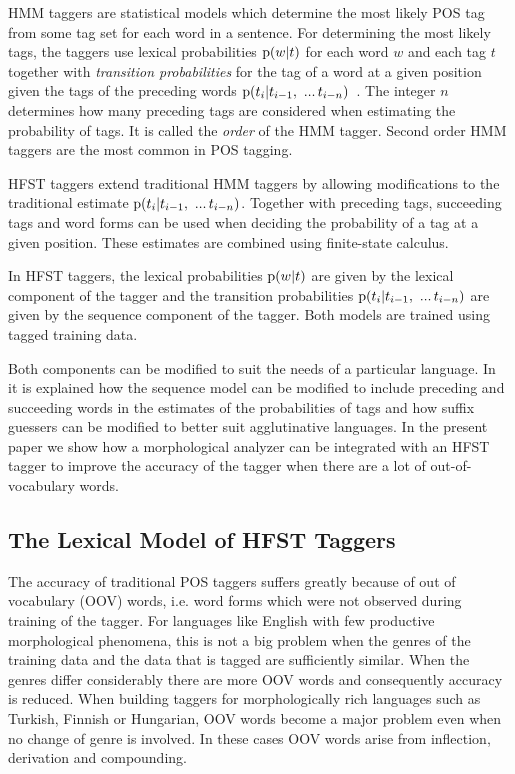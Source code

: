 \documentclass{llncs}
\begin{document}
HMM taggers are statistical models which determine the most likely
POS tag from some tag set for each word in a sentence. For
determining the most likely tags, the taggers use
lexical probabilities ${\rm p}(w|t)$ for each word $w$ and each tag
$t$ together with \emph{transition probabilities} for the tag of a
word at a given position given the tags of the preceding words ${\rm
  p}(t_i | t_{i - 1},\ ...\, t_{i-n})$~\cite{silfverberg/2011/nodalida}. The integer $n$ determines how
many preceding tags are considered when estimating the probability of
tags. It is called the \emph{order} of the HMM tagger. Second order HMM
taggers are the most common in POS tagging.

HFST taggers extend traditional HMM taggers by allowing modifications
to the traditional estimate ${\rm p}(t_i | t_{i - 1},\ ...\,
t_{i-n})$. Together with preceding tags, succeeding tags and word
forms can be used when deciding the probability of a tag at a given
position. These estimates are combined using finite-state calculus.

In HFST taggers, the lexical probabilities ${\rm p}(w|t)$ are given by
the lexical component of the tagger and the transition probabilities
${\rm p}(t_i | t_{i - 1},\ ...\, t_{i-n})$ are given by the sequence
component of the tagger. Both models are trained using tagged
training data.

Both components can be modified to suit the needs of a particular
language. In~\cite{silfverberg/2011/nodalida} it is explained how the sequence
model can be modified to include preceding and succeeding words in
the estimates of the probabilities of tags and how suffix guessers
can be modified to better suit agglutinative languages. In the present paper
we show how a morphological analyzer can be integrated with an HFST
tagger to improve the accuracy of the tagger when there are a lot of
out-of-vocabulary words.


\subsection{The Lexical Model of HFST Taggers}

The accuracy of traditional POS taggers suffers greatly because of
out of vocabulary (OOV) words, i.e. word forms which were not
observed during training of the tagger. For languages like English
with few productive morphological phenomena, this is not a big problem
when the genres of the training data and the data that is tagged are
sufficiently similar. When the genres differ considerably there are
more OOV words and consequently accuracy is reduced. When building
taggers for morphologically rich languages such as Turkish, Finnish or
Hungarian, OOV words become a major problem even when no change of
genre is involved. In these cases OOV words arise from inflection,
derivation and compounding.
\end{document}
